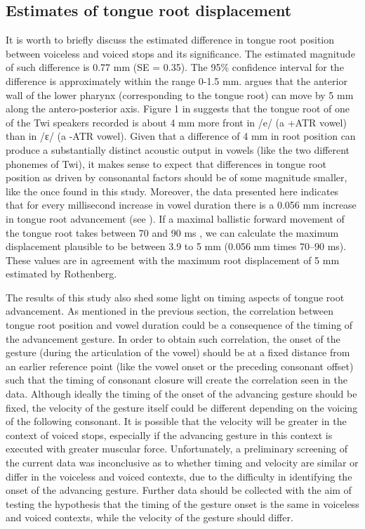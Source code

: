 \documentclass[12pt,]{article}
\begin{document}
\hypertarget{estimates-of-tongue-root-displacement}{%
\subsection{Estimates of tongue root
displacement}\label{estimates-of-tongue-root-displacement}}

It is worth to briefly discuss the estimated difference in tongue root
position between voiceless and voiced stops and its significance. The
estimated magnitude of such difference is 0.77 mm (SE = 0.35). The 95\%
confidence interval for the difference is approximately within the range
0-1.5 mm. \citet{rothenberg1967} argues that the anterior wall of the
lower pharynx (corresponding to the tongue root) can move by 5 mm along
the antero-posterior axis. Figure 1 in \citet{kirkham2017} suggests that
the tongue root of one of the Twi speakers recorded is about 4 mm more
front in /e/ (a +ATR vowel) than in /ɛ/ (a -ATR vowel). Given that a
difference of 4 mm in root position can produce a substantially distinct
acoustic output in vowels (like the two different phonemes of Twi), it
makes sense to expect that differences in tongue root position as driven
by consonantal factors should be of some magnitude smaller, like the
once found in this study. Moreover, the data presented here indicates
that for every millisecond increase in vowel duration there is a 0.056
mm increase in tongue root advancement (see ). If a
maximal ballistic forward movement of the tongue root takes between 70
and 90 ms \citep{rothenberg1967}, we can calculate the maximum
displacement plausible to be between 3.9 to 5 mm (0.056 mm times 70--90
ms). These values are in agreement with the maximum root displacement of
5 mm estimated by Rothenberg.

The results of this study also shed some light on timing aspects of
tongue root advancement. As mentioned in the previous section, the
correlation between tongue root position and vowel duration could be a
consequence of the timing of the advancement gesture. In order to obtain
such correlation, the onset of the gesture (during the articulation of
the vowel) should be at a fixed distance from an earlier reference point
(like the vowel onset or the preceding consonant offset) such that the
timing of consonant closure will create the correlation seen in the
data. Although ideally the timing of the onset of the advancing gesture
should be fixed, the velocity of the gesture itself could be different
depending on the voicing of the following consonant. It is possible that
the velocity will be greater in the context of voiced stops, especially
if the advancing gesture in this context is executed with greater
muscular force. Unfortunately, a preliminary screening of the current
data was inconclusive as to whether timing and velocity are similar or
differ in the voiceless and voiced contexts, due to the difficulty in
identifying the onset of the advancing gesture. Further data should be
collected with the aim of testing the hypothesis that the timing of the
gesture onset is the same in voiceless and voiced contexts, while the
velocity of the gesture should differ.
\end{document}
